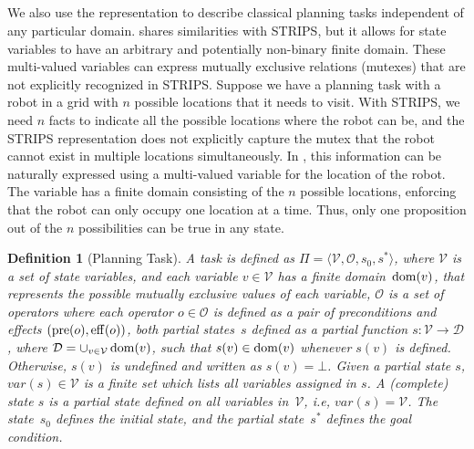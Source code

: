 \documentclass[ppgc,diss,english]{iiufrgs}
\newtheorem{definition}{Definition}
\begin{document}
\subsection{\sas}
\label{sec:background-sas}
We also use the \sas representation to describe classical planning tasks independent of any particular domain. \sas shares similarities with STRIPS, but it allows for state variables to have an arbitrary and potentially non-binary finite domain. These multi-valued variables can express mutually exclusive relations (mutexes) that are not explicitly recognized in STRIPS. Suppose we have a planning task with a robot in a grid with $n$ possible locations that it needs to visit. With STRIPS, we need $n$ facts to indicate all the possible locations where the robot can be, and the STRIPS representation does not explicitly capture the mutex that the robot cannot exist in multiple locations simultaneously. In \sas, this information can be naturally expressed using a multi-valued variable for the location of the robot. The variable has a finite domain consisting of the $n$ possible locations, enforcing that the robot can only occupy one location at a time. Thus, only one proposition out of the $n$ possibilities can be true in any state.

\begin{definition}[\sas Planning Task]\label{def:sas}
A \sas task is defined as $\Pi=\langle\mathcal{V},\mathcal{O},s_0,s^*\rangle$, where $\mathcal{V}$ is a set of state variables, and each variable $v\in \mathcal{V}$ has a finite domain~$\operatorname{dom}(v)$, that represents the possible mutually exclusive values of each variable, $\mathcal{O}$ is a set of operators where each operator $o \in \mathcal{O}$ is defined as a pair of preconditions and effects $(\operatorname{pre}(o),\operatorname{eff}(o))$, both partial states~$s$ defined as a partial function $s:\mathcal{V}\rightarrow \mathcal{D}$, where $\mathcal{D}=\cup_{v\in \mathcal{V}}\operatorname{dom}(v)$, such that $s(v)\in \operatorname{dom}(v)$ whenever $s(v)$ is defined. Otherwise, $s(v)$ is undefined and written as $s(v)=\bot$. Given a partial state $s$, $var(s) \in \mathcal{V}$ is a finite set which lists all variables assigned in $s$. A (complete) state $s$ is a partial state defined on all variables in~$\mathcal{V}$, i.e, $var(s) = \mathcal{V}$. The state~$s_0$ defines the initial state, and the partial state~$s^*$ defines the goal condition.
\end{definition}
\end{document}
